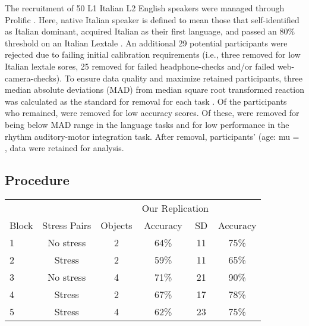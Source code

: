 The recruitment of 50 L1 Italian L2 English speakers were managed through Prolific \citep{Palan_2018}. Here, native Italian speaker is defined to mean those that self-identified as Italian dominant, acquired Italian as their first language, and passed an 80\% threshold on an Italian Lextale \citep{Brown_Tusmagambet_Rahming_Tu_DeSalvo_Wiener_2023}. An additional 29 potential participants were rejected due to failing initial calibration requirements (i.e., three removed for low Italian lextale sores, 25 removed for failed headphone-checks \citep{milne_2021} and/or failed web-camera-checks). To ensure data quality and maximize retained participants, three median absolute deviations (MAD) from median square root transformed reaction was calculated as the standard for removal for each task \citep{Leys_2013}. Of the  participants who remained,  were removed for low accuracy scores. Of these, were removed for being below MAD range in the language tasks and  for low performance in the rhythm auditory-motor integration task.  After removal,  participants' (age: mu = , data were retained for analysis. 


\subsection{Procedure}

\begin{tabular*}{\textwidth}{@{\extracolsep\fill}lccccc}
\toprule
&&& \multicolumn{2}{c}{Our Replication} & \multicolumn{1}{c}{\cite{Sulpizio_McQueen_2012}} \\ 
\cmidrule(lr){4-5} \cmidrule(lr){6-6} %
Block & Stress Pairs & Objects & Accuracy & SD & Accuracy \\
\midrule
1 & No stress & 2 & 64\% & 11 & 75\%\\ 
2 & Stress & 2  & 59\% & 11 & 65\%\\ 
3 & No stress & 4 & 71\% & 21 & 90\% \\ 
4 & Stress & 2 & 67\% & 17 & 78\%\\ 
5 & Stress &  4 & 62\% & 23 & 75\%\\ 
\bottomrule
\end{tabular*}




